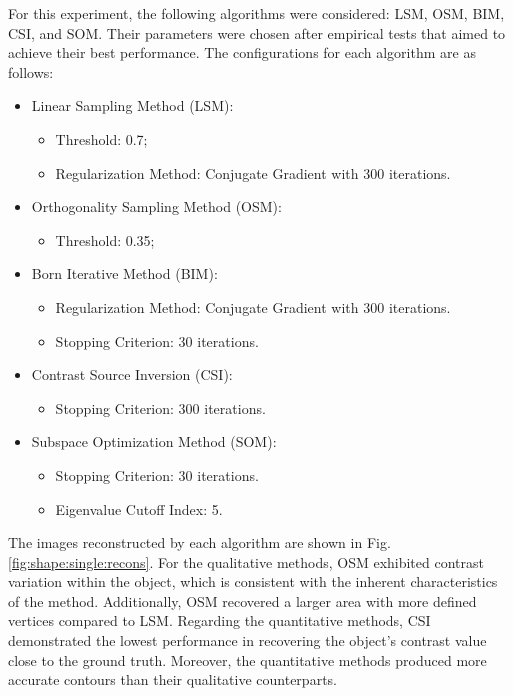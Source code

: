 \documentclass{ieeeaccess}
\begin{document}
            For this experiment, the following algorithms were considered: LSM, OSM, BIM, CSI, and SOM. Their parameters were chosen after empirical tests that aimed to achieve their best performance. The configurations for each algorithm are as follows:
            \begin{itemize}
                \item Linear Sampling Method (LSM):
                \begin{itemize}
                    \item Threshold: 0.7;
                    \item Regularization Method: Conjugate Gradient with 300 iterations.
                \end{itemize}
                \item Orthogonality Sampling Method (OSM):
                \begin{itemize}
                    \item Threshold: 0.35;
                \end{itemize}
                \item Born Iterative Method (BIM):
                \begin{itemize}
                    \item Regularization Method: Conjugate Gradient with 300 iterations.
                    \item Stopping Criterion: 30 iterations.
                \end{itemize}
                \item Contrast Source Inversion (CSI):
                \begin{itemize}
                    \item Stopping Criterion: 300 iterations.
                \end{itemize}
                \item Subspace Optimization Method (SOM):
                \begin{itemize}
                    \item Stopping Criterion: 30 iterations.
                    \item Eigenvalue Cutoff Index: 5.
                \end{itemize}
            \end{itemize}

            The images reconstructed by each algorithm are shown in Fig. \ref{fig:shape:single:recons}. For the qualitative methods, OSM exhibited contrast variation within the object, which is consistent with the inherent characteristics of the method. Additionally, OSM recovered a larger area with more defined vertices compared to LSM. Regarding the quantitative methods, CSI demonstrated the lowest performance in recovering the object's contrast value close to the ground truth. Moreover, the quantitative methods produced more accurate contours than their qualitative counterparts.
\end{document}
